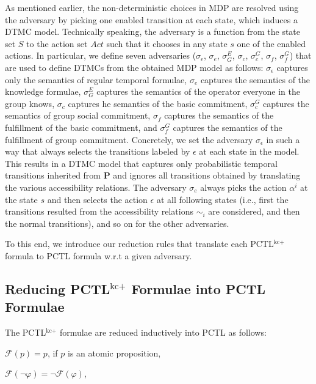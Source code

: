 As mentioned earlier, the non-deterministic choices in MDP are
resolved using the adversary by picking one enabled transition at
each state, which induces a DTMC model. Technically speaking, the
adversary is a function from the state set $S$ to the action set
$Act$ such that it chooses in any state $s$ one of the enabled
actions. In particular, we define seven adversaries
($\sigma_\epsilon$, $\sigma_e$, $\sigma_G^E$, $\sigma_c$,
$\sigma_c^G$, $\sigma_f$, $\sigma_f^G$) that are used to define
DTMCs from the obtained MDP model as follows: $\sigma_\epsilon$
captures only the semantics of regular temporal formulae,
$\sigma_e$ captures the semantics of the knowledge formulae,
$\sigma_G^E$ captures the semantics of the operator everyone in
the group knows, $\sigma_c$ captures he semantics of the basic
commitment, $\sigma_c^G$ captures the semantics of group social
commitment, $\sigma_f$ captures the semantics of the fulfillment
of the basic commitment, and $\sigma_f^G$ captures the semantics
of the fulfillment of group commitment. Concretely, we set the
adversary $\sigma_\epsilon$ in such a way that always selects the
transitions labeled by $\epsilon$ at each state in the model. This
results in a DTMC model that captures only probabilistic temporal
transitions inherited from $\textbf{P}$ and ignores all
transitions obtained by translating the various accessibility
relations. The adversary $\sigma_e$ always picks the action
$\alpha^i$ at the state $s$ and then selects the action $\epsilon$
at all following states (i.e., first the transitions resulted from
the accessibility relations $\sim_i$ are considered, and then the
normal transitions), and so on for the other adversaries.

To this end, we introduce our reduction rules that translate each PCTL$^{\textrm{kc+}}$ formula to PCTL formula w.r.t a given adversary.


\subsection{Reducing PCTL$^{\textrm{kc+}}$ Formulae into PCTL Formulae} \label{sec:reducing-pctlkc-to-pctl-cahp5}

The PCTL$^{\textrm{kc+}}$ formulae are reduced inductively into PCTL as follows:

$\mathscr{F}(p)=p$, if $p$ is an atomic proposition,

$\mathscr{F}(\neg \varphi)= \neg \mathscr{F} (\varphi)$,

